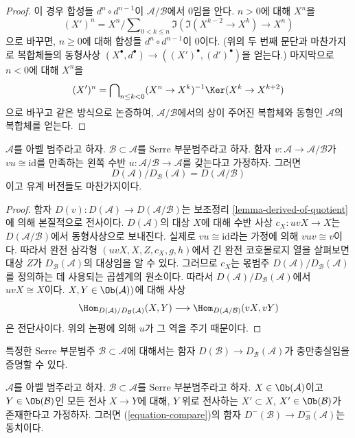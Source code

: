 \begin{proof}
\medskip\noindent
이 경우 합성들 $d^n \circ d^{n - 1}$이 $\mathcal{A}/\mathcal{B}$에서
0임을 안다. $n > 0$에 대해 $X^n$을
$$
(X')^n = X^n/\sum\nolimits_{0 < k \leq n} \Im(\Im(X^{k - 2} \to X^k) \to X^n)
$$
으로 바꾸면, $n \geq 0$에 대해 합성들 $d^n \circ d^{n - 1}$이 0이다.
(위의 두 번째 문단과 마찬가지로 복합체들의 동형사상
$(X^\bullet, d^\bullet) \to ((X')^\bullet, (d')^\bullet)$을 얻는다.)
마지막으로 $n < 0$에 대해 $X^n$을
$$
(X')^n = \bigcap\nolimits_{n \leq k < 0}
(X^n \to X^k)^{-1}\Ker(X^k \to X^{k + 2})
$$
으로 바꾸고 같은 방식으로 논증하여, $\mathcal{A}/\mathcal{B}$에서의
상이 주어진 복합체와 동형인 $\mathcal{A}$의 복합체를 얻는다.
\end{proof}

\begin{lemma}
\label{lemma-quotient-by-serre-easy}
$\mathcal{A}$를 아벨 범주라고 하자.
$\mathcal{B} \subset \mathcal{A}$를 Serre 부분범주라고 하자.
함자 $v : \mathcal{A} \to \mathcal{A}/\mathcal{B}$가
$vu \cong \text{id}$를 만족하는 왼쪽 수반
$u : \mathcal{A}/\mathcal{B} \to \mathcal{A}$를 갖는다고 가정하자.
그러면
$$
D(\mathcal{A})/D_\mathcal{B}(\mathcal{A}) = D(\mathcal{A}/\mathcal{B})
$$
이고 유계 버전들도 마찬가지이다.
\end{lemma}

\begin{proof}
함자 $D(v) : D(\mathcal{A}) \to D(\mathcal{A}/\mathcal{B})$는 보조정리
\ref{lemma-derived-of-quotient}에 의해 본질적으로 전사이다.
$D(\mathcal{A})$의 대상 $X$에 대해 수반 사상 $c_X : uvX \to X$는
$D(\mathcal{A}/\mathcal{B})$에서 동형사상으로 보내진다. 실제로
$vu \cong \text{id}$라는 가정에 의해 $vuv \cong v$이다.
따라서 완전 삼각형 $(uvX, X, Z, c_X, g, h)$에서 긴 완전 코호몰로지
열을 살펴보면 대상 $Z$가 $D_\mathcal{B}(\mathcal{A})$의 대상임을 알 수 있다.
그러므로 $c_X$는 몫범주 $D(\mathcal{A})/D_\mathcal{B}(\mathcal{A})$를
정의하는 데 사용되는 곱셈계의 원소이다. 따라서
$D(\mathcal{A})/D_\mathcal{B}(\mathcal{A})$에서 $uvX \cong X$이다.
$X, Y \in \Ob(\mathcal{A}))$에 대해 사상
$$
\Hom_{D(\mathcal{A})/D_\mathcal{B}(\mathcal{A})}(X, Y)
\longrightarrow
\Hom_{D(\mathcal{A}/\mathcal{B})}(vX, vY)
$$
은 전단사이다. 위의 논평에 의해 $u$가 그 역을 주기 때문이다.
\end{proof}

\noindent
특정한 Serre 부분범주 $\mathcal{B} \subset \mathcal{A}$에 대해서는 함자
$D(\mathcal{B}) \to D_\mathcal{B}(\mathcal{A})$가 충만충실임을 증명할 수 있다.

\begin{lemma}
\label{lemma-fully-faithful-embedding}
$\mathcal{A}$를 아벨 범주라고 하자. $\mathcal{B} \subset \mathcal{A}$를
Serre 부분범주라고 하자. $X \in \Ob(\mathcal{A})$이고
$Y \in \Ob(\mathcal{B})$인 모든 전사 $X \to Y$에 대해,
$Y$ 위로 전사하는 $X' \subset X$, $X' \in \Ob(\mathcal{B})$가
존재한다고 가정하자. 그러면 (\ref{equation-compare})의 함자
$D^-(\mathcal{B}) \to D^-_\mathcal{B}(\mathcal{A})$는 동치이다.
\end{lemma}


